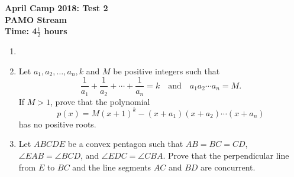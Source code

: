 \documentclass[a4paper,12pt]{article}
\begin{document}
\setcounter{page}{1}

\begin{center}
	\textbf{April Camp 2018: Test 2}\\
	\textbf{PAMO Stream}\\
	\textbf{Time: 4$\frac{1}{2}$ hours}
\end{center}

\begin{enumerate}
\vspace{0.2cm}

\item 


\item %
Let $a_1, a_2, \dotsc, a_n, k$ and $M$ be positive integers such that \[ \frac{1}{a_1} +\frac{1}{a_2} +\dotsb +\frac{1}{a_n} = k \quad\textrm{and}\quad a_1a_2\dotsb a_n = M.\]
If $M > 1$, prove that the polynomial \[p(x) = M(x+1)^k - (x+a_1)(x+a_2)\dotsb(x+a_n)\] has no positive roots.

\item %
Let $ABCDE$ be a convex pentagon such that $AB = BC = CD$, $\angle EAB =\angle BCD$, and $\angle EDC =\angle CBA$. Prove that the perpendicular line from $E$ to $BC$ and the line segments $AC$ and $BD$ are concurrent.


\end{enumerate}
\end{document}
